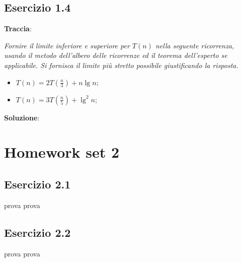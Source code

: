\documentclass{article}
\begin{document}
\subsection{Esercizio 1.4} \label{subsec:esercizio1_4}
\textbf{Traccia}:

\noindent
\textit{Fornire il limite inferiore e superiore per $T(n)$ nella seguente ricorrenza, usando il metodo dell'albero delle ricorrenze ed il teorema dell'esperto se applicabile. Si fornisca il limite più stretto possibile giustificando la risposta.} 
\begin{itemize}
    \item $T(n) = 2T(\frac{n}{3}) + n\lg n$;
    \item $T(n) = 3T(\frac{n}{5}) + \lg^2 n$;
\end{itemize}

\vspace{\baselineskip}
\noindent
\textbf{Soluzione}: 


\section{Homework set 2} \label{sec:homework_2}%
\subsection{Esercizio 2.1} \label{subsec:esercizio2_1}
prova prova
\subsection{Esercizio 2.2} \label{subsec:esercizio2_2}
prova prova
\end{document}
